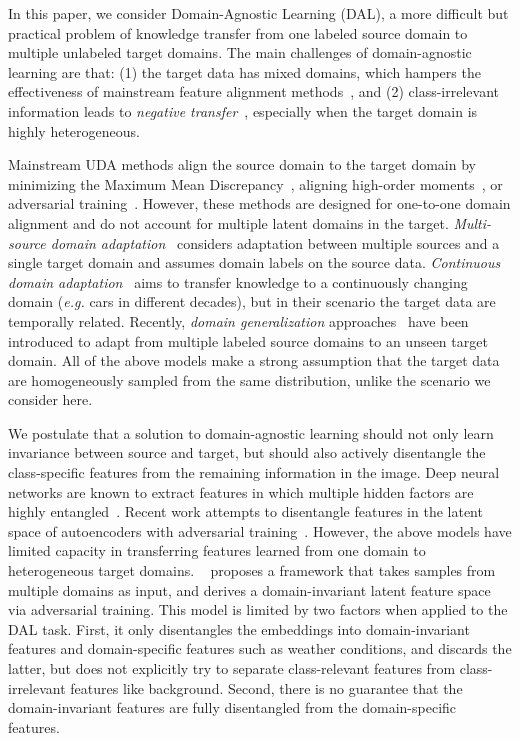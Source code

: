\documentclass{article}
\begin{document}
In this paper, we consider Domain-Agnostic Learning (DAL), a more difficult but practical problem of knowledge transfer from one labeled source domain to multiple unlabeled target domains. The main challenges of domain-agnostic learning are that: (1) the target data has mixed domains, which hampers the effectiveness of mainstream feature alignment methods~\cite{long2015, SunS16a, MCD_2018}, and 
(2) class-irrelevant information leads to \textit{negative transfer}~\cite{pan2010survey}, especially when the target domain is highly heterogeneous. 

Mainstream UDA methods align the source domain to the target domain by minimizing the Maximum Mean Discrepancy~\cite{long2015,ddc}, aligning high-order moments~\cite{SunS16a, cmd}, or adversarial training~\cite{DANN, adda}. However, these methods are designed for one-to-one domain alignment and do not account for multiple latent domains in the target. \textit{Multi-source domain adaptation}~\cite{domainnet, xu2018deep, Mansour_nips2018} considers adaptation between multiple sources and a single target domain and assumes domain labels on the source data. 
\textit{Continuous domain adaptation}~\cite{continuous_DA} aims to transfer knowledge to a continuously changing domain (\textit{e.g.} cars in different decades), but in their scenario the target data are temporally related.
Recently, \textit{domain generalization} approaches~\cite{li2018domain,domain_generalization, li2018domain_} have been introduced to adapt from multiple labeled source domains to an unseen target domain. All of the above models make a strong assumption that the target data are homogeneously sampled from the same distribution, unlike the scenario we consider here. 

We postulate that a solution to domain-agnostic learning should not only learn invariance between source and target, but should also actively disentangle the class-specific features from the remaining information  in the image.
Deep neural networks are known to extract features in which multiple hidden factors are highly entangled~\cite{bengio2013representation}. 
Recent work attempts to disentangle features in the latent space of autoencoders with adversarial training~\cite{dida, detachandattach, cisac_gan, drit}. However, the above models have limited capacity in transferring features learned from one domain to heterogeneous target domains. 
~\citet{ufdn} proposes a framework that takes samples from multiple domains as input, and derives a domain-invariant latent feature space via adversarial training. This model is limited by two factors when applied to the DAL task. First, it only disentangles the embeddings into domain-invariant features and domain-specific features such as weather conditions, and discards the latter, 
but does not explicitly try to separate class-relevant features from class-irrelevant features like background.
Second, there is no guarantee that the domain-invariant features are fully disentangled from the domain-specific features.
\end{document}
